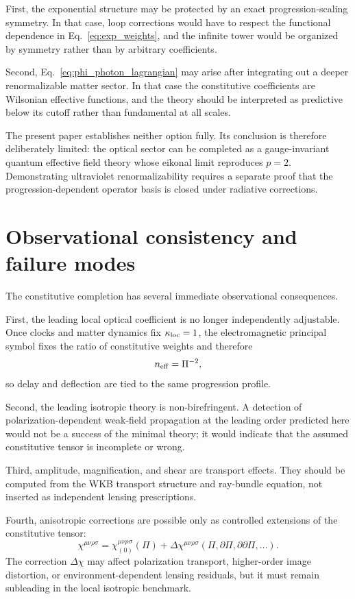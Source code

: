\documentclass[12pt]{article}
\begin{document}
First, the exponential structure may be protected by an exact progression-scaling symmetry.  In that case, loop corrections would have to respect the functional dependence in Eq.~\eqref{eq:exp_weights}, and the infinite tower would be organized by symmetry rather than by arbitrary coefficients.

Second, Eq.~\eqref{eq:phi_photon_lagrangian} may arise after integrating out a deeper renormalizable matter sector.  In that case the constitutive coefficients are Wilsonian effective functions, and the theory should be interpreted as predictive below its cutoff rather than fundamental at all scales.

The present paper establishes neither option fully.  Its conclusion is therefore deliberately limited: the optical sector can be completed as a gauge-invariant quantum effective field theory whose eikonal limit reproduces $p=2$.  Demonstrating ultraviolet renormalizability requires a separate proof that the progression-dependent operator basis is closed under radiative corrections.

\section{Observational consistency and failure modes}
\label{sec:tests}

The constitutive completion has several immediate observational consequences.

First, the leading local optical coefficient is no longer independently adjustable.  Once clocks and matter dynamics fix $\kappa_{\rm loc}=1$, the electromagnetic principal symbol fixes the ratio of constitutive weights and therefore
\begin{equation}
 n_{\rm eff}=\Pi^{-2},
\label{eq:fixed_coeff}
\end{equation}
so delay and deflection are tied to the same progression profile.

Second, the leading isotropic theory is non-birefringent.  A detection of polarization-dependent weak-field propagation at the leading order predicted here would not be a success of the minimal theory; it would indicate that the assumed constitutive tensor is incomplete or wrong.

Third, amplitude, magnification, and shear are transport effects.  They should be computed from the WKB transport structure and ray-bundle equation, not inserted as independent lensing prescriptions.

Fourth, anisotropic corrections are possible only as controlled extensions of the constitutive tensor:
\begin{equation}
 \chi^{\mu\nu\rho\sigma}
 =\chi^{\mu\nu\rho\sigma}_{(0)}(\Pi)
 +\Delta\chi^{\mu\nu\rho\sigma}(\Pi,\partial\Pi,\partial\partial\Pi,\ldots).
\label{eq:delta_chi}
\end{equation}
The correction $\Delta\chi$ may affect polarization transport, higher-order image distortion, or environment-dependent lensing residuals, but it must remain subleading in the local isotropic benchmark.
\end{document}
